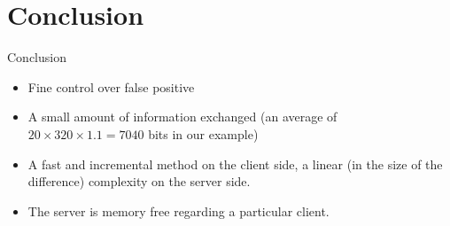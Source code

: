 \documentclass[10pt,xcolor={usenames,dvipsnames,svgnames,table}]{beamer}
\theoremstyle{definition}
\theoremstyle{definition}
\begin{document}
\section{Conclusion}
\begin{frame}
 \begin{exampleblock}{Conclusion}
  \begin{itemize}
   \item Fine control over false positive
   \item A small amount of information exchanged (an average of $20\times 320 \times 1.1 = 7040$ bits in our example)
   \item A fast and incremental method on the client side, a linear (in the size of the difference) complexity on the server side.
   \item The server is memory free regarding a particular client.
  \end{itemize}
  \end{exampleblock}

\end{frame}
\end{document}
